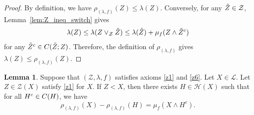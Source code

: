 \documentclass[a4paper,11pt,reqno]{article}
\theoremstyle{definition}
\newtheorem{lemma}[theorem]{{{Lemma}}}
\newcommand{\mH}{\mathcal{H}}
\newcommand{\mZ}{\mathcal{Z}}
\begin{document}
\begin{proof}
    By definition, we have $\rho_{(\lambda,f)}(Z) \leq \lambda(Z)$. Conversely, for any $\Tilde{Z} \in \mathcal{Z}$, Lemma~\ref{lem:Z_ineq_switch} gives
    \[
    \lambda(Z) \leq \lambda(Z \vee_\mathcal{Z} \Tilde{Z}) \leq \lambda(\Tilde{Z}) + \mu_f(Z \wedge \Tilde{Z}^c)
    \]
    for any $\Tilde{Z}^c \in \textup{\textbf{C}}(\Tilde{Z};Z)$. Therefore, the definition of $\rho_{(\lambda,f)}$ gives $\lambda(Z)\leq\rho_{(\lambda,f)}(Z)$.
\end{proof}


\begin{lemma}\label{lem:hyper_not_cyclic}
    Suppose that $(\mZ,\lambda,f)$ satisfies axioms \ref{z1} and \ref{z6}. Let $X \in \mathcal{L}$. %
    Let $Z \in \mathcal{Z}(X)$ 
    satisfy \ref{z1} for $X$. If $Z < X$, then there exists $H \in \mH(X)$ such that for all $H^c \in \textup{\textbf{C}}(H)$, we have
    \[
    \rho_{(\lambda,f)}(X) - \rho_{(\lambda,f)}(H) = \mu_f(X \wedge H^c).
    \]
\end{lemma}
\end{document}
